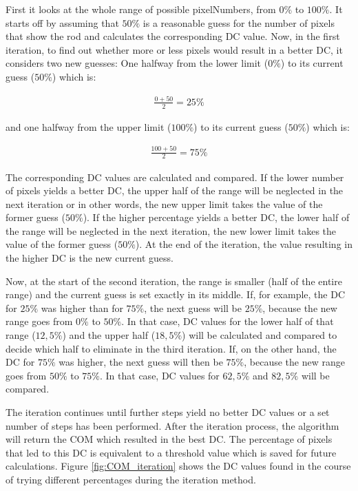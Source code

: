 First it looks at the whole range of possible pixelNumbers, from $0\%$ to $100\%$.
It starts off by assuming that $50\%$ is a reasonable guess for the number of pixels that show the rod and calculates the corresponding DC value.
Now, in the first iteration, to find out whether more or less pixels would result in a better DC, it considers two new guesses:
One halfway from the lower limit ($0\%$) to its current guess ($50\%$) which is:

\begin{align}
 \frac{0+50}{2}=25\% 
\end{align}

and one halfway from the upper limit ($100\%$) to its current guess ($50\%$) which is:
 
\begin{align}
 \frac{100+50}{2}=75\%
\end{align}
 

The corresponding DC values are calculated and compared.
If the lower number of pixels yields a better DC, the upper half of the range will be neglected in the next iteration or in other words, the new upper limit takes the value of the former guess ($50\%$).
If the higher percentage yields a better DC, the lower half of the range will be neglected in the next iteration, the new lower limit takes the value of the former guess ($50\%$).
At the end of the iteration, the value resulting in the higher DC is the new current guess.

Now, at the start of the second iteration, the range is smaller (half of the entire range) and the current guess is set exactly in its middle.
If, for example, the DC for $25\%$ was higher than for $75\%$, the next guess will be $25\%$, because the new range goes from $0\%$ to $50\%$.
In that case, DC values for the lower half of that range ($12,5\%$) and the upper half ($18,5\%$) will be calculated and compared to decide which half to eliminate in the third iteration.
If, on the other hand, the DC for $75\%$ was higher, the next guess will then be $75\%$, because the new range goes from $50\%$ to $75\%$.
In that case, DC values for $62,5\%$ and $82,5\%$ will be compared.

The iteration continues until further steps yield no better DC values or a set number of steps has been performed.
After the iteration process, the algorithm will return the COM which resulted in the best DC.
The percentage of pixels that led to this DC is equivalent to a threshold value which is saved for future calculations.
Figure \ref{fig:COM_iteration} shows the DC values found in the course of trying different percentages during the iteration method.


